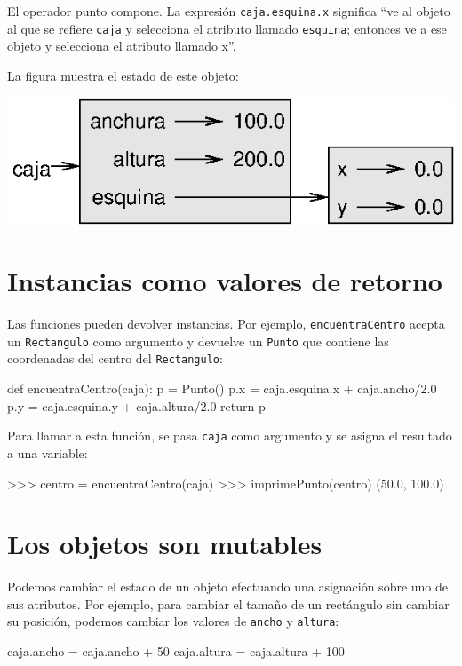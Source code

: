 El operador punto compone. La expresión \texttt{caja.esquina.x} significa
``ve al objeto al que se refiere \texttt{caja} y selecciona el atributo
llamado \texttt{esquina}; entonces ve a ese objeto y selecciona el
atributo llamado x''.

La figura muestra el estado de este objeto:

\beforefig \centerline{\includegraphics{illustrations/rectangle}}
\afterfig

\section{Instancias como valores de retorno}

 

Las funciones pueden devolver instancias. Por ejemplo, \texttt{encuentraCentro}
acepta un \texttt{Rectangulo} como argumento y devuelve un \texttt{Punto}
que contiene las coordenadas del centro del \texttt{Rectangulo}:
\begin{pythoncode}
def encuentraCentro(caja):
  p = Punto()
  p.x = caja.esquina.x + caja.ancho/2.0
  p.y = caja.esquina.y + caja.altura/2.0
  return p
\end{pythoncode}

Para llamar a esta función, se pasa \texttt{caja} como argumento y
se asigna el resultado a una variable:
\begin{pyconcode}
>>> centro = encuentraCentro(caja)
>>> imprimePunto(centro)
(50.0, 100.0)
\end{pyconcode}

\section{Los objetos son mutables}

 

Podemos cambiar el estado de un objeto efectuando una asignación sobre
uno de sus atributos. Por ejemplo, para cambiar el tamaño de un rectángulo
sin cambiar su posición, podemos cambiar los valores de \texttt{ancho}
y \texttt{altura}:
\begin{pythoncode}
caja.ancho = caja.ancho + 50
caja.altura = caja.altura + 100
\end{pythoncode}


